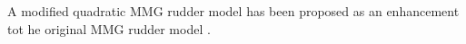 A modified quadratic MMG rudder model has been proposed as an enhancement tot he original MMG rudder model \citep{yasukawaIntroductionMMGStandard2015}.

